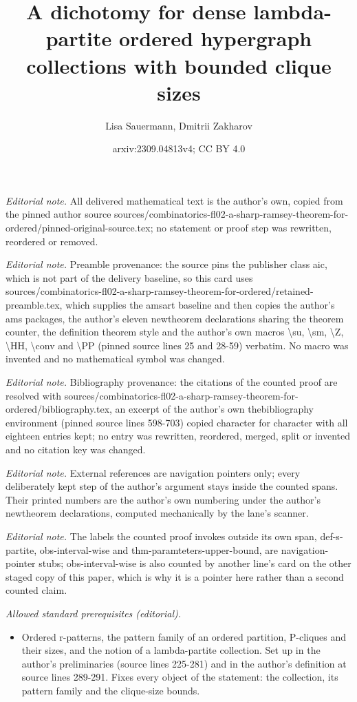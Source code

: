 \documentclass[10pt,a4paper]{amsart}
\title{A dichotomy for dense lambda-partite ordered hypergraph collections with bounded clique sizes}
\author{Lisa Sauermann, Dmitrii Zakharov}
\date{arxiv:2309.04813v4; CC BY 4.0}
\theoremstyle{definition}
\begin{document}
\maketitle
\noindent\textit{Editorial note.} All delivered mathematical text is the author's own, copied from the pinned author source sources/combinatorics-fl02-a-sharp-ramsey-theorem-for-ordered/pinned-original-source.tex; no statement or proof step was rewritten, reordered or removed.\par\medskip
\noindent\textit{Editorial note.} Preamble provenance: the source pins the publisher class aic, which is not part of the delivery baseline, so this card uses sources/combinatorics-fl02-a-sharp-ramsey-theorem-for-ordered/retained-preamble.tex, which supplies the amsart baseline and then copies the author's ams packages, the author's eleven newtheorem declarations sharing the theorem counter, the definition theorem style and the author's own macros \textbackslash{}su, \textbackslash{}sm, \textbackslash{}Z, \textbackslash{}HH, \textbackslash{}conv and \textbackslash{}PP (pinned source lines 25 and 28-59) verbatim. No macro was invented and no mathematical symbol was changed.\par\medskip
\noindent\textit{Editorial note.} Bibliography provenance: the citations of the counted proof are resolved with sources/combinatorics-fl02-a-sharp-ramsey-theorem-for-ordered/bibliography.tex, an excerpt of the author's own thebibliography environment (pinned source lines 598-703) copied character for character with all eighteen entries kept; no entry was rewritten, reordered, merged, split or invented and no citation key was changed.\par\medskip
\noindent\textit{Editorial note.} External references are navigation pointers only; every deliberately kept step of the author's argument stays inside the counted spans. Their printed numbers are the author's own numbering under the author's newtheorem declarations, computed mechanically by the lane's scanner.\par\medskip
\noindent\textit{Editorial note.} The labels the counted proof invokes outside its own span, def-s-partite, obs-interval-wise and thm-paramteters-upper-bound, are navigation-pointer stubs; obs-interval-wise is also counted by another line's card on the other staged copy of this paper, which is why it is a pointer here rather than a second counted claim.\par\medskip
\noindent\textit{Allowed standard prerequisites (editorial).}\begin{itemize}
\item Ordered r-patterns, the pattern family of an ordered partition, P-cliques and their sizes, and the notion of a lambda-partite collection. Set up in the author's preliminaries (source lines 225-281) and in the author's definition at source lines 289-291. Fixes every object of the statement: the collection, its pattern family and the clique-size bounds.
\end{itemize}\medskip
\end{document}
